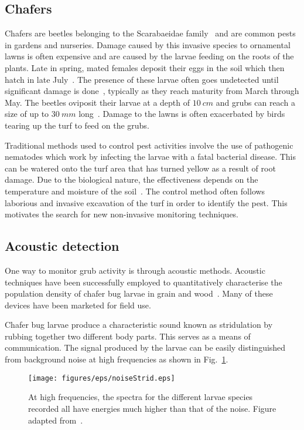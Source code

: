 \documentclass[twocolumn]{article}
\begin{document}
\subsection{Chafers}
Chafers are beetles belonging to the Scarabaeidae family~\cite{chaferFacts}\cite{chaferControl} and are common pests in gardens and nurseries. Damage caused by this invasive species to ornamental lawns is often expensive and are caused by the larvae feeding on the roots of the plants. Late in spring, mated females deposit their eggs in the soil which then hatch in late July~\cite{chaferFacts}. The presence of these larvae often goes undetected until significant damage is done~\cite{stridDetect}, typically as they reach maturity from March through May. The beetles oviposit their larvae at a depth of $10\ \si{cm}$ and grubs can reach a size of up to $30\ \si{mm}$ long~\cite{oviDepth}. Damage to the lawns is often exacerbated by birds tearing up the turf to feed on the grubs.

Traditional methods used to control pest activities involve the use of pathogenic nematodes which work by infecting the larvae with a fatal bacterial disease. This can be watered onto the turf area that has turned yellow as a result of root damage. Due to the biological nature, the effectiveness depends on the temperature and moisture of the soil~\cite{chaferControl}. The control method often follows laborious and invasive excavation of the turf in order to identify the pest. This motivates the search for new non-invasive monitoring techniques.

\subsection{Acoustic detection}
One way to monitor grub activity is through acoustic methods. Acoustic techniques have been successfully employed to quantitatively characterise the population density of chafer bug larvae in grain and wood~\cite{centuryDetect}. Many of these devices have been marketed for field use.

Chafer bug larvae produce a characteristic sound known as stridulation by rubbing together two different body parts. This serves as a means of communication. The signal produced by the larvae can be easily distinguished from background noise at high frequencies as shown in Fig.~\ref{fig:noiseStrid}.

\begin{figure}
    \centering
    \texttt{[image: figures/eps/noiseStrid.eps]}
    \caption{At high frequencies, the spectra for the different larvae species recorded all have energies much higher than that of the noise. Figure adapted from~\cite{xrayTom}.}
    \label{fig:noiseStrid}
\end{figure}
\end{document}
